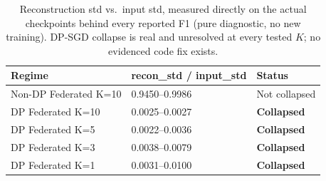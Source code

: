 \begin{table}[t]
\centering
\caption{Reconstruction std vs.\ input std, measured directly on the actual checkpoints behind every reported F1 (pure diagnostic, no new training). DP-SGD collapse is real and unresolved at every tested $K$; no evidenced code fix exists.}
\label{tab:m3-collapse-evidence}
\begin{tabular}{@{}lll@{}}
\toprule
Regime & recon\_std / input\_std & Status \\
\midrule
Non-DP Federated K=10 & 0.9450--0.9986 & Not collapsed \\
DP Federated K=10 & 0.0025--0.0027 & \textbf{Collapsed} \\
DP Federated K=5 & 0.0022--0.0036 & \textbf{Collapsed} \\
DP Federated K=3 & 0.0038--0.0079 & \textbf{Collapsed} \\
DP Federated K=1 & 0.0031--0.0100 & \textbf{Collapsed} \\
\bottomrule
\end{tabular}
\end{table}
